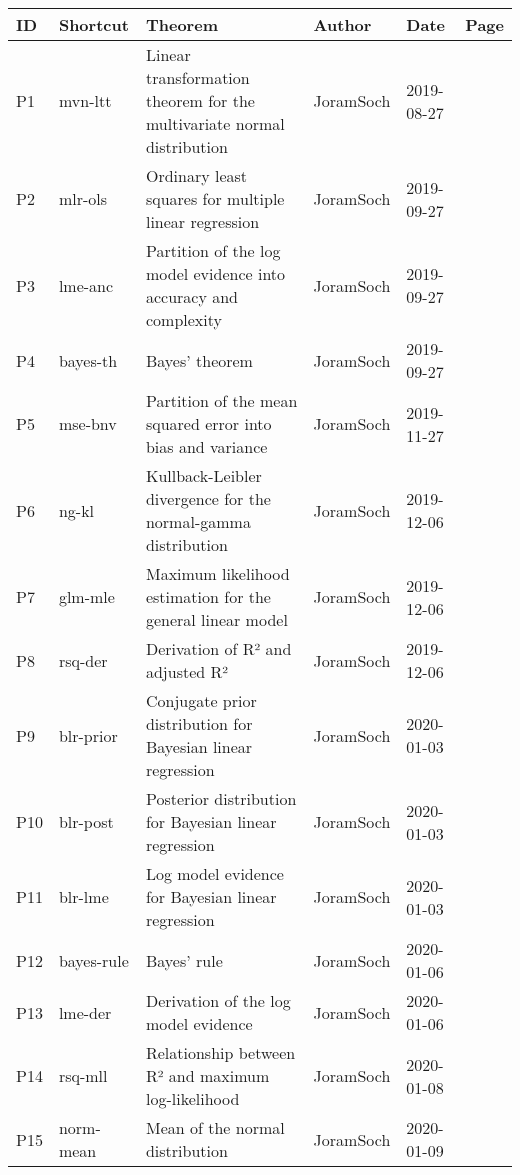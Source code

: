 \documentclass[a4paper,12pt,twoside]{book}
\begin{document}
\begin{longtable}{|p{1cm}|p{2cm}|p{6.5cm}|p{3cm}|p{2cm}|c|}
\hline
\textbf{ID} & \textbf{Shortcut} & \textbf{Theorem} & \textbf{Author} & \textbf{Date} & \textbf{Page} \\ \hline
P1 & mvn-ltt & Linear transformation theorem for the multivariate normal distribution & JoramSoch & 2019-08-27 & \pageref{sec:mvn-ltt} \\ \hline
P2 & mlr-ols & Ordinary least squares for multiple linear regression & JoramSoch & 2019-09-27 & \pageref{sec:mlr-ols} \\ \hline
P3 & lme-anc & Partition of the log model evidence into accuracy and complexity & JoramSoch & 2019-09-27 & \pageref{sec:lme-anc} \\ \hline
P4 & bayes-th & Bayes' theorem & JoramSoch & 2019-09-27 & \pageref{sec:bayes-th} \\ \hline
P5 & mse-bnv & Partition of the mean squared error into bias and variance & JoramSoch & 2019-11-27 & \pageref{sec:mse-bnv} \\ \hline
P6 & ng-kl & Kullback-Leibler divergence for the normal-gamma distribution & JoramSoch & 2019-12-06 & \pageref{sec:ng-kl} \\ \hline
P7 & glm-mle & Maximum likelihood estimation for the general linear model & JoramSoch & 2019-12-06 & \pageref{sec:glm-mle} \\ \hline
P8 & rsq-der & Derivation of R² and adjusted R² & JoramSoch & 2019-12-06 & \pageref{sec:rsq-der} \\ \hline
P9 & blr-prior & Conjugate prior distribution for Bayesian linear regression & JoramSoch & 2020-01-03 & \pageref{sec:blr-prior} \\ \hline
P10 & blr-post & Posterior distribution for Bayesian linear regression & JoramSoch & 2020-01-03 & \pageref{sec:blr-post} \\ \hline
P11 & blr-lme & Log model evidence for Bayesian linear regression & JoramSoch & 2020-01-03 & \pageref{sec:blr-lme} \\ \hline
P12 & bayes-rule & Bayes' rule & JoramSoch & 2020-01-06 & \pageref{sec:bayes-rule} \\ \hline
P13 & lme-der & Derivation of the log model evidence & JoramSoch & 2020-01-06 & \pageref{sec:lme-der} \\ \hline
P14 & rsq-mll & Relationship between R² and maximum log-likelihood & JoramSoch & 2020-01-08 & \pageref{sec:rsq-mll} \\ \hline
P15 & norm-mean & Mean of the normal distribution & JoramSoch & 2020-01-09 & \pageref{sec:norm-mean} \\ \hline

\end{longtable}
\end{document}
